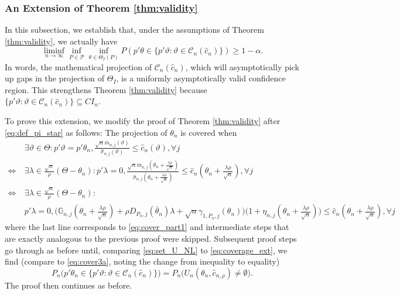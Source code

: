 \documentclass[letterpaper,11pt]{article}
\theoremstyle{myplain}
\theoremstyle{mydefinition}
\theoremstyle{myremark}
\newcommand{\cC}{\mathcal{C}}
\newcommand{\larhon}{\frac{\lambda \rho }{\sqrt n}}
\newcommand{\tlarhon}{\tfrac{\lambda \rho }{\sqrt n}}
\numberwithin{equation}{section}
\numberwithin{figure}{section}
\begin{document}
\begin{appendices}
\subsubsection{An Extension of Theorem \ref{thm:validity}}
\label{cor:math:proj}
In this subsection, we establish that, under the assumptions of Theorem \ref{thm:validity}, we actually have
\begin{equation}
\liminf_{n\to\infty}\inf_{P\in\mathcal P}	\inf_{\theta \in \Theta_I(P)} P(p'\theta \in \{p'\vartheta:\vartheta \in \cC_n(\hat{c}_n)\}) \geq 1-\alpha.
\end{equation} 
In words, the mathematical projection of $ \cC_n(\hat{c}_n)$, which will asymptotically pick up gaps in the projection of $\Theta_I$, is a uniformly asymptotically valid confidence region. This strengthens Theorem \ref{thm:validity} because $\{p'\vartheta:\vartheta \in \cC_n(\hat{c}_n)\} \subseteq CI_n$.

To prove this extension, we modify the proof of Theorem \ref{thm:validity} after \eqref{eq:def_pi_star} as follows: The projection of $\theta_n$ is covered when
\begin{align}
& ~\exists \vartheta \in \Theta: p'\vartheta=p'\theta_n, \tfrac{\sqrt n \bar{m}_{n,j}(\vartheta)}{\hat\sigma_{n,j}(\vartheta)}\le  \hat{c}_n(\vartheta),  \forall j \\
\Longleftrightarrow &~\exists \lambda \in \tfrac{\sqrt n}{\rho }(\Theta-\theta_n): p'\lambda=0, \tfrac{\sqrt n \bar{m}_{n,j}(\theta_n+\larhon)}{\hat\sigma_{n,j}(\theta_n+\larhon)}\le  \hat{c}_n(\theta_n+\tlarhon),  \forall j \\
\Longleftrightarrow &~\exists \lambda \in \tfrac{\sqrt n}{\rho }(\Theta-\theta_n): \\
 & ~ p'\lambda=0, \bigl(\mathbb G_{n,j}(\theta_n+\tlarhon)+\rho  D_{P_n,j}(\bar\theta_n)\lambda+\sqrt{n} \gamma_{1,P_n,j}(\theta_n)\bigr)\bigl(1+\eta_{n,j}(\theta_n+\tlarhon)\bigr)\le  \hat{c}_n(\theta_n+\tlarhon), \forall j \label{eq:coverage_ext}  
	 \end{align}
	 where the last line corresponds to \eqref{eq:cover_part1} and intermediate steps that are exactly analogous to the previous proof were skipped. Subsequent proof steps go through as before until, comparing \eqref{eq:set_U_NL} to \eqref{eq:coverage_ext}, we find (compare to \eqref{eq:cover3a}, noting the change from inequality to equality)
	 \begin{equation}
P_n\bigl(p'\theta_n \in \{p'\vartheta:\vartheta \in \cC_n(\hat{c}_n)\}\bigr)  = P_{n}\bigl(U_{n}(\theta_{n},\hat{c}_{n,\rho})\neq \emptyset\bigr).	\label{eq:cover3a_ext}
\end{equation}
The proof then continues as before.




\end{appendices}
\end{document}
